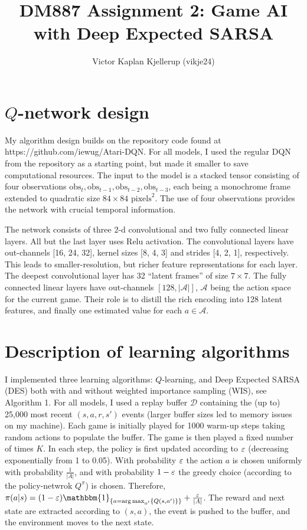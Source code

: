 \documentclass{article}
\begin{document}
\title{DM887 Assignment 2: Game AI with Deep Expected SARSA}
\author{Victor Kaplan Kjellerup (vikje24)}
\date{}  %
\maketitle




\section{\(Q\)-network design}
My algorithm design builds on the repository code found at https://github.com/iewug/Atari-DQN. For all models, I used the regular DQN from the repository as a starting point, but made it smaller to save computational resources. The input to the model is a stacked tensor consisting of four observations \(\text{obs}_t, \text{obs}_{t-1}, \text{obs}_{t-2}, \text{obs}_{t-3}\), each being a monochrome frame extended to quadratic size \(84 \times 84\) \(\text{pixels}^2\). The use of four observations provides the network with crucial temporal information.

The network consists of three 2-d convolutional and two fully connected linear layers. All but the last layer uses Relu activation. The convolutional layers have out-channels [16, 24, 32], kernel sizes [8, 4, 3] and strides [4, 2, 1], respectively. This leads to smaller-resolution, but richer feature representations for each layer. The deepest convolutional layer has 32 ``latent frames'' of size \(7 \times 7\). The fully connected linear layers have out-channels \([128, |\mathcal{A}|]\), \(\mathcal{A}\) being the action space for the current game. Their role is to distill the rich encoding into 128 latent features, and finally one estimated value for each \(a \in \mathcal{A}\).

\section{Description of learning algorithms}
I implemented three learning algorithms: \(Q\)-learning, and Deep Expected SARSA (DES) both with and without weighted importance sampling (WIS), see Algorithm 1.
For all models, I used a replay buffer \(\mathcal{D}\) containing the (up to) 25,000 most recent \((s, a, r, s')\) events (larger buffer sizes led to memory issues on my machine). Each game is initially played for 1000 warm-up steps taking random actions to populate the buffer. The game is then played a fixed number of times \(K\). In each step, the policy is first updated according to \(\varepsilon\) (decreasing exponentially from 1 to 0.05). With probability \(\varepsilon\) the action \(a\) is chosen uniformly with probability \(\frac{1}{|A|}\), and with probability \(1-\varepsilon\) the greedy choice (according to the policy-netwrok \(Q^\pi\)) is chosen. Therefore, \(\pi(a|s) = (1 - \eps) \mathbbm{1}_{\set{a = \arg\max_{a'}\set{Q(s,a')}}} + \frac{\eps}{|A|}\). The reward and next state are extracted according to \((s,a)\), the event is pushed to the buffer, and the environment moves to the next state.
\end{document}

